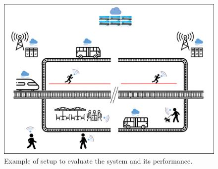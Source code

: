 \begin{figure}[t]
	\centering
	\includegraphics[width=.7\textwidth]{images/evaluation/evaluation.png}
	\caption{Example of setup to evaluate the system and its performance.}
	\label{fog_setup}
\end{figure}
